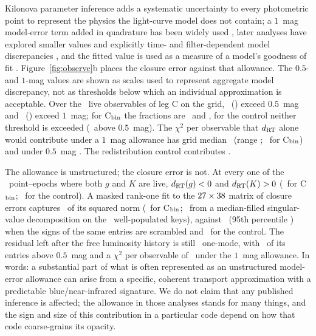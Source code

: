 \documentclass[11pt]{article}
\newcommand{\Cboth}{C\xspace}
\newcommand{\Cbin}{C$_{\rm bin}$\xspace}
\newcommand{\dRT}{d_{\rm RT}}
\begin{document}
Kilonova parameter inference adds a systematic uncertainty to every photometric point to represent the physics the light-curve model does not contain; a $1$~mag model-error term added in quadrature has been widely used \cite{coughlin2018}, later analyses have explored smaller values \cite{pang2023} and explicitly time- and filter-dependent model discrepancies \cite{jhawar2025}, and the fitted value is used as a measure of a model's goodness of fit \cite{hussenot2025}. Figure~\ref{fig:observe}b places the closure error against that allowance. The $0.5$- and $1$-mag values are shown as scales used to represent aggregate model discrepancy, not as thresholds below which an individual approximation is acceptable. Over the \SysLive\ live observables of leg \Cboth on the grid, \SysGtHalf\ (\SysGtHalfCount) exceed $0.5$~mag and \SysGtOne\ (\SysGtOneCount) exceed $1$~mag; for \Cbin the fractions are \SysBinnedGtHalf\ and \SysBinnedGtOne, for the control neither threshold is exceeded (\SysControlGtHalf\ above $0.5$~mag). The $\chi^2$ per observable that $\dRT$ alone would contribute under a $1$~mag allowance has grid median \SysChiOne\ (range \SysChiOneRange; \SysBinnedChiOne\ for \Cbin) and under $0.5$~mag \SysChiHalf. The redistribution control contributes \SysControlChiOne.  %

The allowance is unstructured; the closure error is not. At every one of the \SysSign\ point--epochs where both $g$ and $K$ are live, $\dRT(g)<0$ and $\dRT(K)>0$ (\SysBinnedSign\ for \Cbin; \SysControlSign\ for the control). A masked rank-one fit to the $27\times38$ matrix of closure errors captures \SysOneMode\ of its squared norm (\SysBinnedOneMode\ for \Cbin; \SysSVD\ from a median-filled singular-value decomposition on the \SysSVDKeys\ well-populated keys), against \SysNullMedian\ (95th percentile \SysNullNinetyFive) when the signs of the same entries are scrambled and \SysControlOneMode\ for the control. The residual left after the free luminosity history is still \SysResidOneMode\ one-mode, with \SysResidGtHalf\ of its entries above $0.5$~mag and a $\chi^2$ per observable of \SysResidChiOne\ under the $1$~mag allowance. In words: a substantial part of what is often represented as an unstructured model-error allowance can arise from a specific, coherent transport approximation with a predictable blue/near-infrared signature. We do not claim that any published inference is affected; the allowance in those analyses stands for many things, and the sign and size of this contribution in a particular code depend on how that code coarse-grains its opacity.  %
\end{document}
